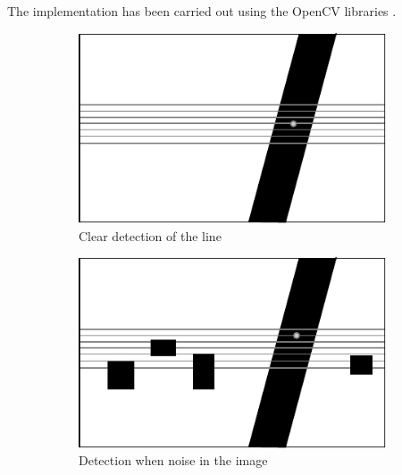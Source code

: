 	The implementation has been carried out using the OpenCV libraries \cite{opencv}.
		\begin{figure}
	        \centering
	        \begin{subfigure}[ht!]{0.296\textwidth}
	            \includegraphics[width=\textwidth]{figs/mr_camera_processing_1}
	            \caption{Clear detection of the line}
	            \label{fig:mr_camera_processing_1}
	        \end{subfigure}
	        \hspace{40pt}
	        \begin{subfigure}[ht!]{0.296\textwidth}
	            \includegraphics[width=\textwidth]{figs/mr_camera_processing_2}
	            \caption{Detection when noise in the image}
	            \label{fig:mr_camera_processing_2}
	    	\end{subfigure}
	    	\begin{subfigure}[ht!]{0.296\textwidth}

\end{subfigure}
\end{figure}
